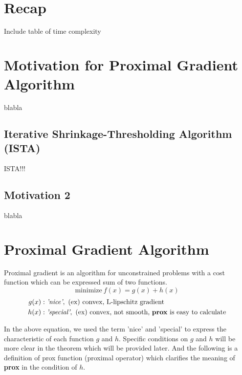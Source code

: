 \documentclass[12pt]{report}
\begin{document}

\maketitle


\section{Recap}
Include table of time complexity

\section{Motivation for Proximal Gradient Algorithm}
blabla

\subsection{Iterative Shrinkage-Thresholding Algorithm (ISTA)}
ISTA!!!

\subsection{Motivation 2}
blabla

\section{Proximal Gradient Algorithm}
Proximal gradient is an algorithm for unconstrained problems with a cost function which can be expressed sum of two functions.
\begin{equation}
\textrm{minimize}~f(x)=g(x)+h(x)
\end{equation}
\vspace{-2.5em}
\begin{align*}
g(x)&: \textit{'nice'}, \text{ (ex) convex, L-lipschitz gradient}\\
h(x)&: \textit{'special'}, \text{ (ex) convex, not smooth, \textbf{prox} is easy to calculate}
\end{align*}

In the above equation, we used the term 'nice' and 'special' to express the characteristic of each function $g$ and $h$. Specific conditions on $g$ and $h$ will be more clear in the theorem which will be provided later. And the following is a definition of prox function (proximal operator) which clarifies the meaning of \textbf{prox} in the condition of $h$.
\end{document}
